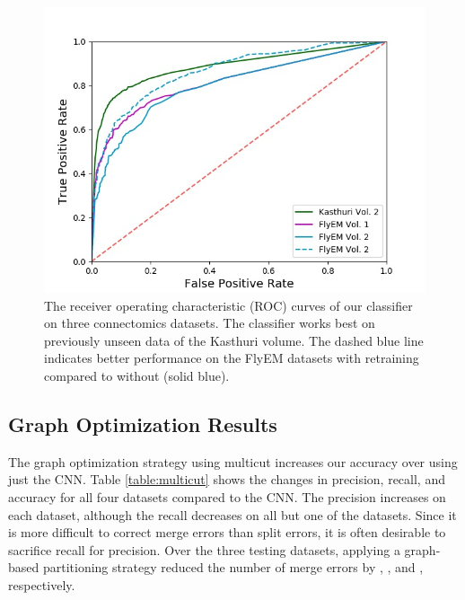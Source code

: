 \begin{figure}
	\centering
	\includegraphics[width=0.95\linewidth]{./figures/receiver-operating-characteristic.jpg}
	\caption{The receiver operating characteristic (ROC) curves of our classifier on three connectomics datasets. The classifier works best on previously unseen data of the Kasthuri volume. The dashed blue line indicates better performance on the FlyEM datasets with retraining compared to without (solid blue).}
	\label{fig:receiver-operating-characteristic}
\end{figure}

\subsection{Graph Optimization Results}

The graph optimization strategy using multicut increases our accuracy over using just the CNN.
Table \ref{table:multicut} shows the changes in precision, recall, and accuracy for all four datasets compared to the CNN.
The precision increases on each dataset, although the recall decreases on all but one of the datasets.
Since it is more difficult to correct merge errors than split errors, it is often desirable to sacrifice recall for precision.
Over the three testing datasets, applying a graph-based partitioning strategy reduced the number of merge errors by , , and , respectively. 

